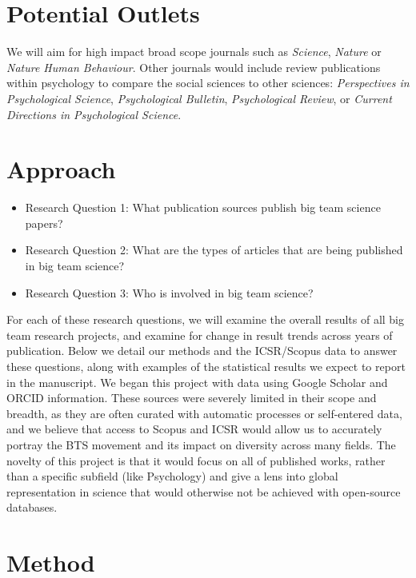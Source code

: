 \documentclass[
  man]{apa7}
\providecommand{\tightlist}{%
  \setlength{\itemsep}{0pt}\setlength{\parskip}{0pt}}
\begin{document}
\hypertarget{potential-outlets}{%
\section{Potential Outlets}\label{potential-outlets}}

We will aim for high impact broad scope journals such as \emph{Science},
\emph{Nature} or \emph{Nature Human Behaviour}. Other journals would include
review publications within psychology to compare the social sciences to
other sciences: \emph{Perspectives in Psychological Science}, \emph{Psychological
Bulletin}, \emph{Psychological Review}, or \emph{Current Directions in
Psychological Science}.

\hypertarget{approach}{%
\section{Approach}\label{approach}}

\begin{itemize}
\tightlist
\item
  Research Question 1: What publication sources publish big team
  science papers?
\item
  Research Question 2: What are the types of articles that are being
  published in big team science?
\item
  Research Question 3: Who is involved in big team science?
\end{itemize}

For each of these research questions, we will examine the overall
results of all big team research projects, and examine for change in
result trends across years of publication. Below we detail our methods
and the ICSR/Scopus data to answer these questions, along with examples
of the statistical results we expect to report in the manuscript. We
began this project with data using Google Scholar and ORCID information.
These sources were severely limited in their scope and breadth, as they
are often curated with automatic processes or self-entered data, and we
believe that access to Scopus and ICSR would allow us to accurately
portray the BTS movement and its impact on diversity across many fields.
The novelty of this project is that it would focus on all of published
works, rather than a specific subfield (like Psychology) and give a lens
into global representation in science that would otherwise not be
achieved with open-source databases.

\hypertarget{method}{%
\section{Method}\label{method}}
\end{document}
